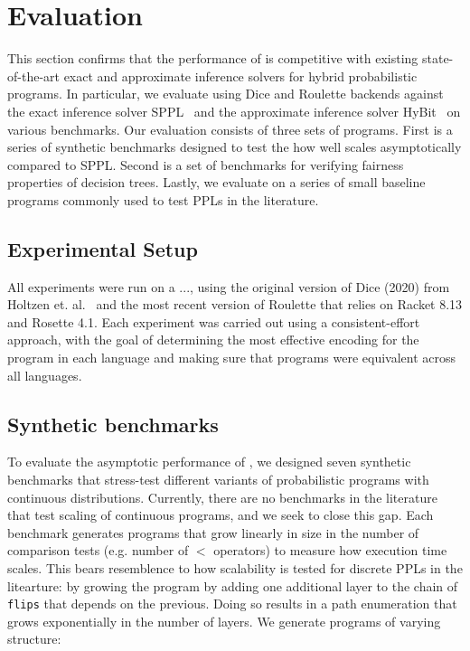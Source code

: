 \section{Evaluation}\label{sec:evaluation}

This section confirms that the performance of \Slice{} is competitive with existing state-of-the-art exact and approximate inference solvers for hybrid probabilistic programs. In particular, we evaluate \Slice{} using Dice and Roulette backends against the exact inference solver SPPL~\cite{Saad2021SPPL} and the approximate inference solver HyBit~\cite{Garg2024BitBlast} on various benchmarks. Our evaluation consists of three sets of programs. First is a series of synthetic benchmarks designed to test the how well \Slice{} scales asymptotically compared to SPPL. Second is a set of benchmarks for verifying fairness properties of decision trees. Lastly, we evaluate \Slice{} on a series of small baseline programs commonly used to test PPLs in the literature. 

\subsection{Experimental Setup}\label{sec:experimenal-setup}
All experiments were run on a ..., using the original version of Dice (2020) from Holtzen et. al.~\cite{Holtzen2020Dice} and the most recent version of Roulette that relies on Racket 8.13 and Rosette 4.1. Each experiment was carried out using a consistent-effort approach, with the goal of determining the most effective encoding for the program in each language and making sure that programs were equivalent across all languages. 

\subsection{Synthetic benchmarks}\label{sec:synthetic-benchmarks}
To evaluate the asymptotic performance of \Slice{}, we designed seven synthetic benchmarks that stress-test different variants of probabilistic programs with continuous distributions. Currently, there are no benchmarks in the literature that test scaling of continuous programs, and we seek to close this gap. Each benchmark generates programs that grow linearly in size in the number of comparison tests (e.g. number of $<$ operators) to measure how execution time scales. This bears resemblence to how scalability is tested for discrete PPLs in the litearture: by growing the program by adding one additional layer to the chain of \texttt{flips} that depends on the previous. Doing so results in a path enumeration that grows exponentially in the number of layers. We generate programs of varying structure:

